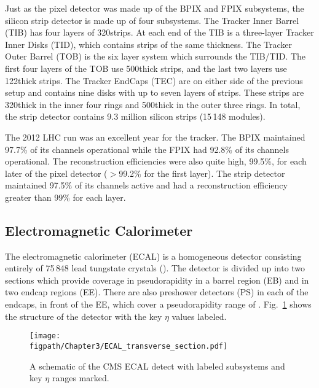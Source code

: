 Just as the pixel detector was made up of the BPIX and FPIX subsystems, the silicon strip detector is made up of four subsystems.
The Tracker Inner Barrel
(TIB) has four layers of 320\mum strips.
At each end of the TIB is a three-layer Tracker Inner Disks (TID), which contains strips of the same thickness.
The Tracker Outer Barrel (TOB) is the six layer system which surrounds the TIB/TID.
The first four layers of the TOB use 500\mum thick strips, and the last two layers use 122\mum thick strips.
The Tracker EndCaps (TEC) are on either side of the previous setup and contains nine disks with up to seven layers of strips.
These strips are 320\mum thick in the inner four rings and 500\mum thick in the outer three rings.
In total, the strip detector contains 9.3 million silicon strips (15\,148 modules).

The 2012 LHC run was an excellent year for the tracker.
The BPIX maintained 97.7\% of its channels operational while the FPIX had 92.8\% of its channels operational.
The reconstruction efficiencies were also quite high, 99.5\%, for each later of the pixel detector ($>$99.2\% for the first layer).
The strip detector maintained 97.5\% of its channels active and had a reconstruction efficiency greater than 99\% for each layer\cite{Veszpremi:2014hpa}. 

\subsection{Electromagnetic Calorimeter}

The electromagnetic calorimeter (ECAL) is a homogeneous detector consisting entirely of 75\,848 lead tungstate crystals (\PbWO).
The detector is divided up into two sections which provide coverage in pseudorapidity  in a barrel region (EB) and  in two endcap regions (EE).
There are also preshower detectors (PS) in each of the endcaps, in front of the EE, which cover a pseudorapidity range of .
Fig.~\ref{fig:CMS_ECAL} shows the structure of the detector with the key $\eta$ values labeled.

\begin{figure}[!hbt]
    \centering
    \texttt{[image: \\figpath/Chapter3/ECAL\_transverse\_section.pdf]}
    \caption{A schematic of the CMS ECAL detect with labeled subsystems and key $\eta$ ranges marked.}
    \label{fig:CMS_ECAL}
\end{figure}

